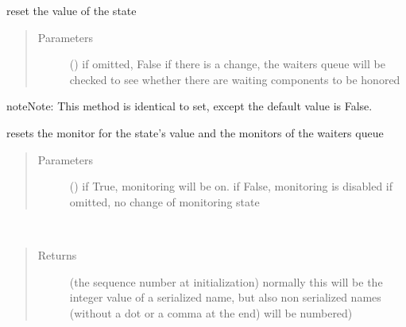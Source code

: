 \documentclass[letterpaper,10pt,english]{sphinxmanual}
\begin{document}
\begin{fulllineitems}
\begin{fulllineitems}
\label{\detokenize{Reference:salabim.State.reset}}
reset the value of the state
\begin{quote}\begin{description}
\item[{Parameters}] \leavevmode
{} (\sphinxstyleliteralemphasis{ (}\sphinxstyleliteralemphasis{)}) \textendash{} if omitted, False 
if there is a change, the waiters queue will be checked
to see whether there are waiting components to be honored

\end{description}\end{quote}

\begin{sphinxadmonition}{note}{Note:}
This method is identical to set, except the default value is False.
\end{sphinxadmonition}

\end{fulllineitems}


\begin{fulllineitems}
\label{\detokenize{Reference:salabim.State.reset_monitors}}
resets the monitor for the state’s value and the monitors of the waiters queue
\begin{quote}\begin{description}
\item[{Parameters}] \leavevmode
{} () \textendash{} if True, monitoring will be on. 
if False, monitoring is disabled 
if omitted, no change of monitoring state

\end{description}\end{quote}

\end{fulllineitems}


\begin{fulllineitems}
\label{\detokenize{Reference:salabim.State.sequence_number}}~\begin{quote}\begin{description}
\item[{Returns}] \leavevmode
{} \textendash{} (the sequence number at initialization) 
normally this will be the integer value of a serialized name,
but also non serialized names (without a dot or a comma at the end)
will be numbered)


\end{description}
\end{quote}
\end{fulllineitems}
\end{fulllineitems}
\end{document}
